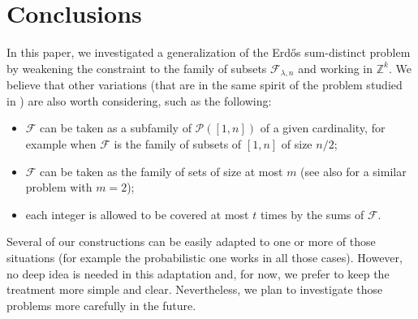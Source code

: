 \documentclass[a4paper]{amsart}
\theoremstyle{plain}
\begin{document}
\section{Conclusions}
In this paper, we investigated a generalization of the Erd\H{o}s sum-distinct problem by weakening the constraint to the family of subsets $\mathcal{F}_{\lambda,n}$ and working in $\mathbb{Z}^k$. We believe that other variations (that are in the same spirit of the problem studied in \cite{MYR}) are also worth considering, such as the following:
\begin{itemize}
\item[1)] $\mathcal{F}$ can be taken as a subfamily of $\mathcal{P}([1,n])$ of a given cardinality,  for example when $\mathcal{F}$ is the family of subsets of $[1,n]$ of  size $n/2$; 
\item[2)] $\mathcal{F}$ can be taken as the family of sets of size at most $m$ (see also \cite{DD} for a similar problem with $m=2$);
\item[3)] each integer is allowed to be covered at most $t$ times by the sums of $\mathcal{F}$.
\end{itemize}
Several of our constructions can be easily adapted to one or more of those situations (for example the probabilistic one works in all those cases). However, no deep idea is needed in this adaptation and, for now, we prefer to keep the treatment more simple and clear. Nevertheless, we plan to investigate those problems more carefully in the future.
\end{document}
